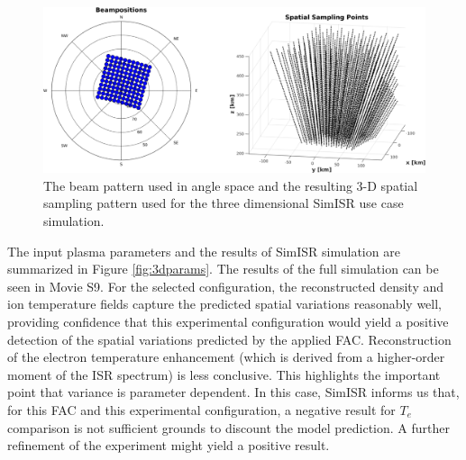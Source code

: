 \documentclass[draft,ras]{agutex}
\begin{document}
\begin{article}
\begin{figure}[!t]
\centering
\includegraphics[width=6in]{Sampling3d}
\caption{The beam pattern used in angle space and the resulting 3-D spatial sampling pattern used for the three dimensional SimISR use case simulation.}
\label{fig:3dsampling}
\end{figure}

The input plasma parameters and the results of SimISR simulation are summarized in Figure \ref{fig:3dparams}. The results of the full simulation can be seen in Movie S9. For the selected configuration, the reconstructed density and ion temperature fields capture the predicted spatial variations reasonably well, providing confidence that this experimental configuration would yield a positive detection of the spatial variations predicted by the applied FAC.  Reconstruction of the electron temperature enhancement (which is derived from a higher-order moment of the ISR spectrum) is less conclusive. This highlights the important point that variance is parameter dependent. In this case, SimISR informs us that, for this FAC and this experimental configuration, a negative result for $T_e$ comparison is not sufficient grounds to discount the model prediction.  A further refinement of the experiment might yield a positive result.
  

\end{article}
\end{document}
